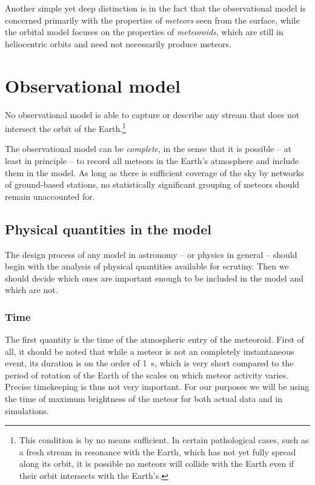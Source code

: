 Another simple yet deep distinction is in the fact that the observational model is concerned
primarily with the properties of \emph{meteors} seen from the surface, while the orbital model focuses
on the properties of \emph{meteoroids}, which are still in heliocentric orbits and need not necessarily produce meteors.



\section{Observational model} \label{ms}

    No observational model is able to capture or describe any stream that does not intersect the orbit of the
    Earth.\footnote{This condition is by no means sufficient. In certain pathological cases, such as a fresh stream in resonance
    with the Earth, which has not yet fully spread along its orbit, it is possible no meteors will collide with the Earth even
    if their orbit intersects with the Earth's.}

    The observational model can be \emph{complete}, in the sense that it is possible -- at least
    in principle -- to record all meteors in the Earth's atmosphere and include them in the model.
    As long as there is sufficient coverage of the sky by networks of ground-based stations,
    no statistically significant grouping of meteors should remain unaccounted for.

    \subsection{Physical quantities in the model} \label{msp}
        The design process of any model in astronomy -- or physics in general -- should begin with the analysis
        of physical quantities available for scrutiny. Then we should decide which ones are important enough
        to be included in the model and which are not.

        \subsubsection{Time} \label{mspt}
            The first quantity is the time of the atmospheric entry of the meteoroid.
            First of all, it should be noted that while a meteor is not an completely instantaneous event,
            its duration is on the order of \SI{1}{\second}, which is very short compared to the
            period of rotation of the Earth of the scales on which meteor activity varies.
            Precise timekeeping is thus not very important.
            For our purposes we will be using the time of maximum brightness
            of the meteor for both actual data and in simulations.

